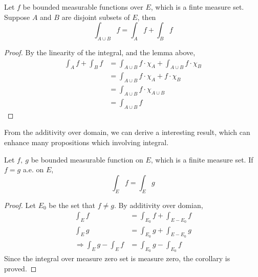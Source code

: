 \documentclass[lang=en, 12pt]{elegantbook}
\begin{document}
            \begin{theorem}
                Let $f$ be bounded measurable functions over $E$, which is a finte measure set. Suppose $A$ and $B$ are disjoint subsets
            of $E$, then 
            $$\int_{A \cup B} f = \int_{A} f + \int_B f$$
            \end{theorem}
            \begin{proof}
                By the linearity of the integral, and the lemma above,
                \begin{equation*}
                    \begin{aligned}
                        \int_A f +\int_B f &= \int_{A \cup B} f \cdot \chi_A +\int_{A \cup B} f\cdot \chi_B\\
                        &= \int_{A \cup B} f \cdot \chi_A + f\cdot \chi_B\\
                        &= \int_{A \cup B} f \cdot \chi_{A\cup B}\\
                        &= \int_{A \cup B} f 
                    \end{aligned}
                \end{equation*}
            \end{proof}
            From the additivity over domain, we can derive a interesting result, which can enhance many propositions which involving integral.
            \begin{corollary}
                Let $f, \ g$ be bounded measurable function on $E$, which is a finite measure set. If $f = g$ a.e. on $E$, 
                $$\int_E f = \int_E g$$
            \end{corollary}
            \begin{proof}
                Let $E_0$ be the set that $f \neq g$. By additivity over domian,
                \begin{equation*}
                    \begin{aligned}
                        \int_E f &= \int_{E_0} f + \int_{E-E_0} f\\
                        \int_E g &= \int_{E_0} g + \int_{E-E_0} g\\
                        \Rightarrow \int_E g - \int_E f &= \int_{E_0} g - \int_{E_0} f
                    \end{aligned}
                \end{equation*}
                Since the integral over measure zero set is measure zero, the corollary is proved.
            \end{proof}
        
\end{document}
